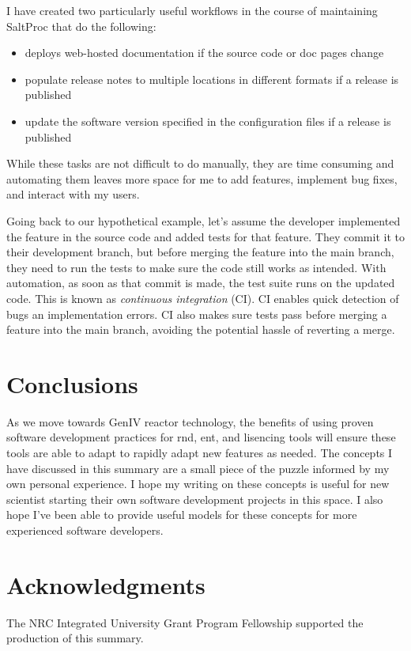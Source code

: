 \documentclass{anstrans}
\begin{document}
     I have created two particularly useful workflows in the course of maintaining SaltProc that do the following:
     \begin{itemize}
         \item deploys web-hosted documentation if the source code or doc pages change
         \item populate release notes to multiple locations in different formats if a release is published
         \item update the software version specified in the configuration files if a release is published
     \end{itemize}
     While these tasks are not difficult to do manually, they are time consuming and automating them leaves more space for me to add features, implement bug fixes, and interact with my users.
    
    Going back to our hypothetical example, let's assume the developer implemented the feature in the source code and added tests for that feature. They commit it to their development branch, but before merging the feature into the main branch, they need to run the tests to make sure the code still works as intended. With automation, as soon as that commit is made, the test suite runs on the updated code. This is known as {\it continuous integration} (CI). CI enables quick detection of bugs an implementation errors. CI also makes sure tests pass before merging a feature into the main branch, avoiding the potential hassle of reverting a merge.
    

\section{Conclusions}

    As we move towards GenIV reactor technology, the benefits of using proven software development practices for \Gls{rnd}, \Gls{ent}, and lisencing tools will ensure these tools are able to adapt to rapidly adapt new features as needed. The concepts I have discussed in this summary are a small piece of the puzzle informed by my own personal experience. I hope my writing on these concepts is useful for new scientist starting their own software development projects in this
    space. I also hope I've been able to provide useful models for these concepts for more experienced software developers. 

\section{Acknowledgments}
The NRC Integrated University Grant Program Fellowship supported the production of this summary.



\end{document}
